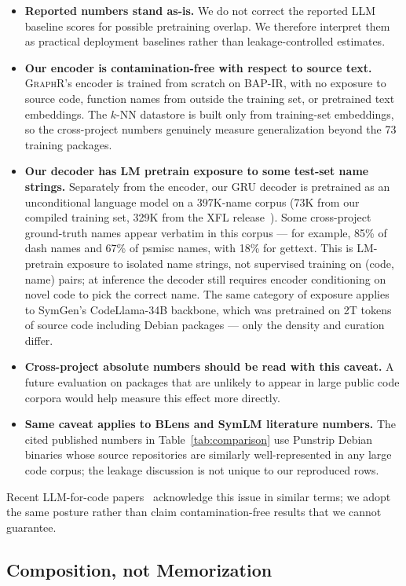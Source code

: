 \documentclass[sigconf,nonacm]{acmart}
\newcommand{\sysname}{\textsc{GraphR}}
\begin{document}
\begin{itemize}
    \item \textbf{Reported numbers stand as-is.} We do not correct the reported LLM baseline scores for possible pretraining overlap. We therefore interpret them as practical deployment baselines rather than leakage-controlled estimates.
    \item \textbf{Our encoder is contamination-free with respect to source text.} \sysname{}'s encoder is trained from scratch on BAP-IR, with no exposure to source code, function names from outside the training set, or pretrained text embeddings. The $k$-NN datastore is built only from training-set embeddings, so the cross-project numbers genuinely measure generalization beyond the 73 training packages.
    \item \textbf{Our decoder has LM pretrain exposure to some test-set name strings.} Separately from the encoder, our GRU decoder is pretrained as an unconditional language model on a 397K-name corpus (73K from our compiled training set, 329K from the XFL release~\cite{xfl}). Some cross-project ground-truth names appear verbatim in this corpus --- for example, 85\% of dash names and 67\% of psmisc names, with 18\% for gettext. This is LM-pretrain exposure to isolated name strings, not supervised training on (code, name) pairs; at inference the decoder still requires encoder conditioning on novel code to pick the correct name. The same category of exposure applies to SymGen's CodeLlama-34B backbone, which was pretrained on 2T tokens of source code including Debian packages --- only the density and curation differ.
    \item \textbf{Cross-project absolute numbers should be read with this caveat.} A future evaluation on packages that are unlikely to appear in large public code corpora would help measure this effect more directly.
    \item \textbf{Same caveat applies to BLens and SymLM literature numbers.} The cited published numbers in Table~\ref{tab:comparison} use Punstrip Debian binaries whose source repositories are similarly well-represented in any large code corpus; the leakage discussion is not unique to our reproduced rows.
\end{itemize}

Recent LLM-for-code papers~\cite{symgen,prorec,beyondclass} acknowledge this issue in similar terms; we adopt the same posture rather than claim contamination-free results that we cannot guarantee.

\subsection{Composition, not Memorization}
\label{sec:comp-vs-mem}
\end{document}
